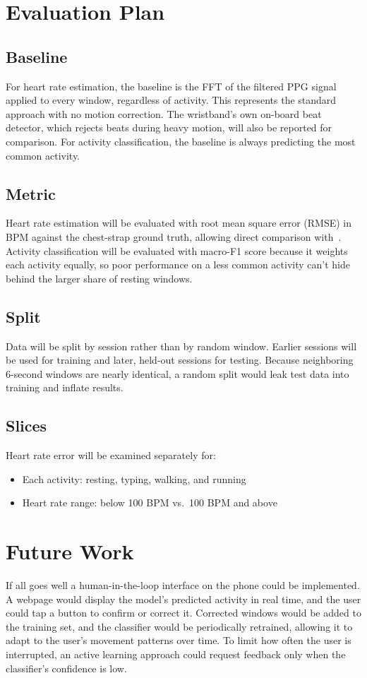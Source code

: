 \documentclass[conference]{IEEEtran}
\begin{document}
\section{Evaluation Plan}

\subsection{Baseline}
For heart rate estimation, the baseline is the FFT of the filtered PPG signal applied to every window, regardless of activity. This represents the standard approach with no motion correction. The wristband's own on-board beat detector, which rejects beats during heavy motion, will also be reported for comparison. For activity classification, the baseline is always predicting the most common activity.

\subsection{Metric}
Heart rate estimation will be evaluated with root mean square error (RMSE) in BPM against the chest-strap ground truth, allowing direct comparison with~\cite{vicente2023}. Activity classification will be evaluated with macro-F1 score because it weights each activity equally, so poor performance on a less common activity can't hide behind the larger share of resting windows.

\subsection{Split}
Data will be split by session rather than by random window. Earlier sessions will be used for training and later, held-out sessions for testing. Because neighboring 6-second windows are nearly identical, a random split would leak test data into training and inflate results.

\subsection{Slices}
Heart rate error will be examined separately for:
\begin{itemize}
    \item Each activity: resting, typing, walking, and running
    \item Heart rate range: below 100 BPM vs.\ 100 BPM and above
\end{itemize}

\section{Future Work}
If all goes well a human-in-the-loop interface on the phone could be implemented. A webpage would display the model's predicted activity in real time, and the user could tap a button to confirm or correct it. Corrected windows would be added to the training set, and the classifier would be periodically retrained, allowing it to adapt to the user's movement patterns over time. To limit how often the user is interrupted, an active learning approach could request feedback only when the classifier's confidence is low.
\end{document}
